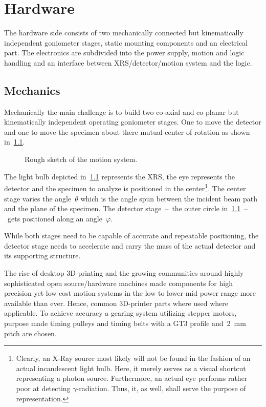 \chapter{Hardware}
    The hardware side consists of two mechanically connected but kinematically independent goniometer stages, static mounting components and an electrical part.
    The electronics are subdivided into the power supply, motion and logic handling and an interface between XRS/detector/motion system and the logic.

    \section{Mechanics}
        Mechanically the main challenge is to build two co-axial and co-planar but kinematically independent operating goniometer stages.
        One to move the detector and one to move the specimen about there mutual center of rotation as shown in~\cref{fig:rough sketch of the motion system}.
        \begin{figure}[h]
            \centering
            \caption[Rough sketch of the motion system.]{Rough sketch of the motion system.}%
            \label{fig:rough sketch of the motion system}%
        \end{figure}
        The light bulb depicted in~\cref{fig:rough sketch of the motion system} represents the XRS, the eye represents the detector and the specimen to analyze is positioned in the center\footnote{Clearly, an X-Ray source most likely will not be found in the fashion of an actual incandescent light bulb. Here, it merely serves as a visual shortcut representing a photon source. Furthermore, an actual eye performs rather poor at detecting \(\gamma\)-radiation. Thus, it, as well, shall serve the purpose of representation.}.
        The center stage varies the angle~\(\theta\) which is the angle spun between the incident beam path and the plane of the specimen.
        The detector stage~--~the outer circle in~\cref{fig:rough sketch of the motion system}~--~gets positioned along an angle~\(\varphi\).\par\medskip

        While both stages need to be capable of accurate and repeatable positioning, the detector stage needs to accelerate and carry the mass of the actual detector and its supporting structure.

        The rise of desktop 3D-printing and the growing communities around highly sophisticated open source/hardware machines made components for high precision yet low cost motion systems in the low to lower-mid power range more available than ever.
        Hence, common 3D-printer parts where used where applicable.
        To achieve accuracy a gearing system utilizing stepper motors, purpose made timing pulleys and timing belts with a GT3 profile and~\qty{2}{\milli\metre} pitch are chosen\cite{Manual.POWERGRIPGT3,Manual.LIGHTPOWERPRECISION}.
        
